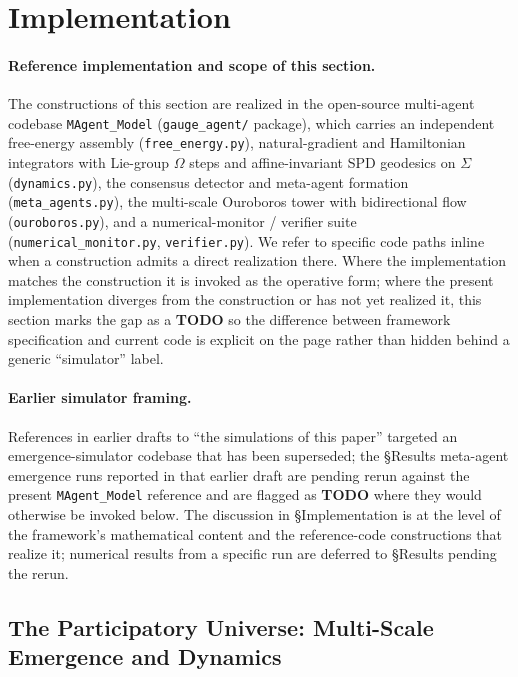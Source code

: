 \documentclass[11pt]{article}
\begin{document}
\section{Implementation}
\label{sec:implementation}

\paragraph{Reference implementation and scope of this section.}
\label{sec:reference_implementation}
The constructions of this section are realized in the open-source multi-agent codebase \texttt{MAgent\_Model} (\texttt{gauge\_agent/} package), which carries an independent free-energy assembly (\texttt{free\_energy.py}), natural-gradient and Hamiltonian integrators with Lie-group $\Omega$ steps and affine-invariant SPD geodesics on $\Sigma$ (\texttt{dynamics.py}), the consensus detector and meta-agent formation (\texttt{meta\_agents.py}), the multi-scale Ouroboros tower with bidirectional flow (\texttt{ouroboros.py}), and a numerical-monitor / verifier suite (\texttt{numerical\_monitor.py}, \texttt{verifier.py}). We refer to specific code paths inline when a construction admits a direct realization there. Where the implementation matches the construction it is invoked as the operative form; where the present implementation diverges from the construction or has not yet realized it, this section marks the gap as a \textbf{TODO} so the difference between framework specification and current code is explicit on the page rather than hidden behind a generic ``simulator'' label.

\paragraph{Earlier simulator framing.}
References in earlier drafts to ``the simulations of this paper'' targeted an emergence-simulator codebase that has been superseded; the §Results meta-agent emergence runs reported in that earlier draft are pending rerun against the present \texttt{MAgent\_Model} reference and are flagged as \textbf{TODO} where they would otherwise be invoked below. The discussion in §Implementation is at the level of the framework's mathematical content and the reference-code constructions that realize it; numerical results from a specific run are deferred to §Results pending the rerun.

\subsection{The Participatory Universe: Multi-Scale Emergence and Dynamics}
\label{sec:participatory}
\end{document}
